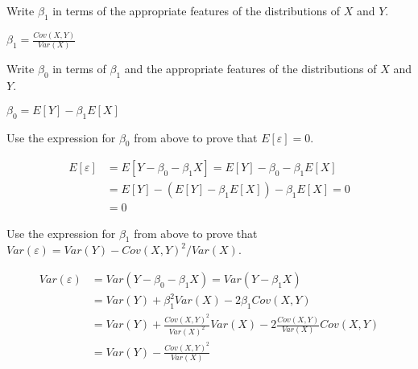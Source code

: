 \documentclass[addpoints,12pt]{exam}
\begin{document}
\begin{questions}


\question Write $\beta_1$ in terms of the appropriate features of the distributions of $X$ and $Y$.
\begin{solution}
  $\beta_1 = \displaystyle\frac{Cov(X,Y)}{Var(X)}$
\end{solution}

\question Write $\beta_0$ in terms of $\beta_1$ and the appropriate features of the distributions of $X$ and $Y$.
\begin{solution}
  $\beta_0 = E[Y] - \beta_1 E[X]$
\end{solution}

\question Use the expression for $\beta_0$ from above to prove that $E[\varepsilon] = 0$.
\begin{solution}
  \begin{align*}
    E[\varepsilon] &= E[Y - \beta_0 - \beta_1 X] = E[Y] - \beta_0 - \beta_1 E[X]\\
    &= E[Y] - \left( E[Y] - \beta_1 E[X] \right) - \beta_1 E[X] = 0\\
    &=0
  \end{align*}
\end{solution}

\question Use the expression for $\beta_1$ from above to prove that $Var(\varepsilon) = Var(Y) - Cov(X,Y)^2/Var(X)$.
\begin{solution}
  \begin{align*}
    Var(\varepsilon) &= Var\left( Y - \beta_0 - \beta_1 X \right) = Var(Y - \beta_1 X) \\
    &= Var(Y) + \beta_1^2 Var(X) -2\beta_1 Cov(X,Y)\\
    &= Var(Y) + \frac{Cov(X,Y)^2}{Var(X)^2} Var(X) -2\frac{Cov(X,Y)}{Var(X)} Cov(X,Y)\\
    &= Var(Y) - \frac{Cov(X,Y)^2}{Var(X)}
  \end{align*}
\end{solution}


\end{questions}
\end{document}
